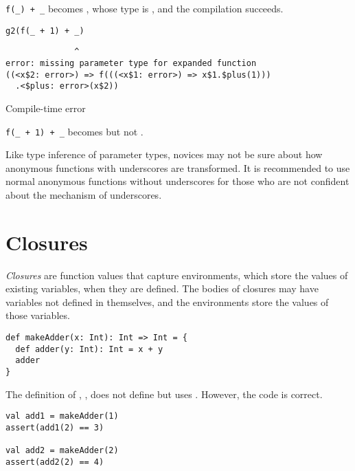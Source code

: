 \verb!f(_) + _! becomes , whose type is , and the compilation succeeds.

\begin{verbatim}
g2(f(_ + 1) + _)
\end{verbatim}
\vspace{-1em}
\begin{mdframed}[hidealllines=true,backgroundcolor=red!10,innerleftmargin=3pt,innerrightmargin=3pt,leftmargin=-3pt,rightmargin=-3pt]
\begin{verbatim}
              ^
error: missing parameter type for expanded function
((<x$2: error>) => f(((<x$1: error>) => x$1.$plus(1)))
  .<$plus: error>(x$2))
\end{verbatim}
\vspace{-2em}
\begin{flushright}
\scriptsize\textsf{Compile-time error}
\end{flushright}
\end{mdframed}

\verb!f(_ + 1) + _! becomes
 but not .

Like type inference of parameter types, novices may not be sure about how
anonymous functions with underscores are transformed. It is recommended to use normal anonymous
functions without underscores for those who are not confident about the mechanism
of underscores.

\section{Closures}

\textit{Closures} are function values that capture
environments, which store the values of existing variables, when they are defined.
The bodies of closures may
have variables not defined in themselves, and the environments store the values
of those variables.

\begin{verbatim}
def makeAdder(x: Int): Int => Int = {
  def adder(y: Int): Int = x + y
  adder
}
\end{verbatim}

The definition of , , does not
define but uses . However, the code is correct.

\begin{verbatim}
val add1 = makeAdder(1)
assert(add1(2) == 3)

val add2 = makeAdder(2)
assert(add2(2) == 4)
\end{verbatim}

